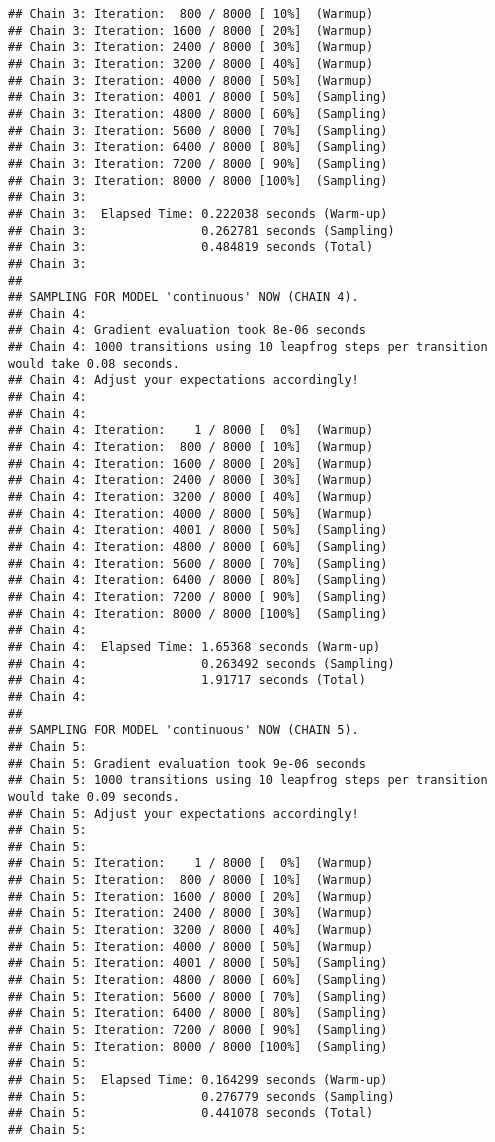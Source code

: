 \documentclass[
]{article}
\begin{document}
\begin{verbatim}
## Chain 3: Iteration:  800 / 8000 [ 10%]  (Warmup)
## Chain 3: Iteration: 1600 / 8000 [ 20%]  (Warmup)
## Chain 3: Iteration: 2400 / 8000 [ 30%]  (Warmup)
## Chain 3: Iteration: 3200 / 8000 [ 40%]  (Warmup)
## Chain 3: Iteration: 4000 / 8000 [ 50%]  (Warmup)
## Chain 3: Iteration: 4001 / 8000 [ 50%]  (Sampling)
## Chain 3: Iteration: 4800 / 8000 [ 60%]  (Sampling)
## Chain 3: Iteration: 5600 / 8000 [ 70%]  (Sampling)
## Chain 3: Iteration: 6400 / 8000 [ 80%]  (Sampling)
## Chain 3: Iteration: 7200 / 8000 [ 90%]  (Sampling)
## Chain 3: Iteration: 8000 / 8000 [100%]  (Sampling)
## Chain 3: 
## Chain 3:  Elapsed Time: 0.222038 seconds (Warm-up)
## Chain 3:                0.262781 seconds (Sampling)
## Chain 3:                0.484819 seconds (Total)
## Chain 3: 
## 
## SAMPLING FOR MODEL 'continuous' NOW (CHAIN 4).
## Chain 4: 
## Chain 4: Gradient evaluation took 8e-06 seconds
## Chain 4: 1000 transitions using 10 leapfrog steps per transition would take 0.08 seconds.
## Chain 4: Adjust your expectations accordingly!
## Chain 4: 
## Chain 4: 
## Chain 4: Iteration:    1 / 8000 [  0%]  (Warmup)
## Chain 4: Iteration:  800 / 8000 [ 10%]  (Warmup)
## Chain 4: Iteration: 1600 / 8000 [ 20%]  (Warmup)
## Chain 4: Iteration: 2400 / 8000 [ 30%]  (Warmup)
## Chain 4: Iteration: 3200 / 8000 [ 40%]  (Warmup)
## Chain 4: Iteration: 4000 / 8000 [ 50%]  (Warmup)
## Chain 4: Iteration: 4001 / 8000 [ 50%]  (Sampling)
## Chain 4: Iteration: 4800 / 8000 [ 60%]  (Sampling)
## Chain 4: Iteration: 5600 / 8000 [ 70%]  (Sampling)
## Chain 4: Iteration: 6400 / 8000 [ 80%]  (Sampling)
## Chain 4: Iteration: 7200 / 8000 [ 90%]  (Sampling)
## Chain 4: Iteration: 8000 / 8000 [100%]  (Sampling)
## Chain 4: 
## Chain 4:  Elapsed Time: 1.65368 seconds (Warm-up)
## Chain 4:                0.263492 seconds (Sampling)
## Chain 4:                1.91717 seconds (Total)
## Chain 4: 
## 
## SAMPLING FOR MODEL 'continuous' NOW (CHAIN 5).
## Chain 5: 
## Chain 5: Gradient evaluation took 9e-06 seconds
## Chain 5: 1000 transitions using 10 leapfrog steps per transition would take 0.09 seconds.
## Chain 5: Adjust your expectations accordingly!
## Chain 5: 
## Chain 5: 
## Chain 5: Iteration:    1 / 8000 [  0%]  (Warmup)
## Chain 5: Iteration:  800 / 8000 [ 10%]  (Warmup)
## Chain 5: Iteration: 1600 / 8000 [ 20%]  (Warmup)
## Chain 5: Iteration: 2400 / 8000 [ 30%]  (Warmup)
## Chain 5: Iteration: 3200 / 8000 [ 40%]  (Warmup)
## Chain 5: Iteration: 4000 / 8000 [ 50%]  (Warmup)
## Chain 5: Iteration: 4001 / 8000 [ 50%]  (Sampling)
## Chain 5: Iteration: 4800 / 8000 [ 60%]  (Sampling)
## Chain 5: Iteration: 5600 / 8000 [ 70%]  (Sampling)
## Chain 5: Iteration: 6400 / 8000 [ 80%]  (Sampling)
## Chain 5: Iteration: 7200 / 8000 [ 90%]  (Sampling)
## Chain 5: Iteration: 8000 / 8000 [100%]  (Sampling)
## Chain 5: 
## Chain 5:  Elapsed Time: 0.164299 seconds (Warm-up)
## Chain 5:                0.276779 seconds (Sampling)
## Chain 5:                0.441078 seconds (Total)
## Chain 5:
\end{verbatim}
\end{document}
